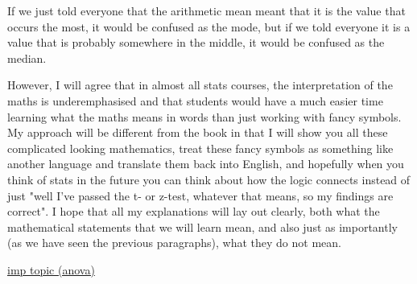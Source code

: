 If we just told everyone that the arithmetic mean meant that it is the value that occurs the most, it would be confused as the mode, but if we told everyone it is a value that is probably somewhere in the middle, it would be confused as the median.

However, I will agree that in almost all stats courses, the interpretation of the maths is underemphasised and that students would have a much easier time learning what the maths means in words than just working with fancy symbols. My approach will be different from the book in that I will show you all these complicated looking mathematics, treat these fancy symbols as something like another language and translate them back into English, and hopefully when you think of stats in the future you can think about how the logic connects instead of just "well I've passed the t- or z-test, whatever that means, so my findings are correct". I hope that all my explanations will lay out clearly, both what the mathematical statements that we will learn mean, and also just as importantly (as we have seen the previous paragraphs), what they do not mean.

\hyperlink{https://en.wikipedia.org/wiki/Analysis_of_variance}{imp topic (anova)}